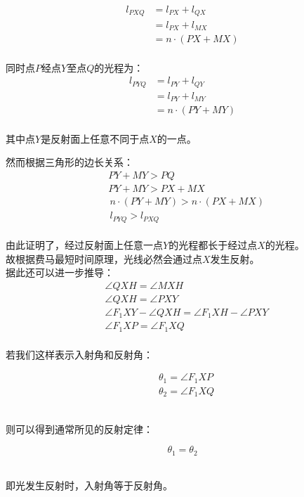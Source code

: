 \documentclass[UTF8]{ctexart}
\begin{document}
    \begin{align}
        l_{PXQ}
        &=l_{PX}+l_{QX}\\[1mm]
        &=l_{PX}+l_{MX}\\[1mm]
        &=n\cdot(PX+MX)
    \end{align}\\
    同时点$P$经点$Y$至点$Q$的光程为：
    \begin{align}
        l_{PYQ}
        &=l_{PY}+l_{QY}\\[1mm]
        &=l_{PY}+l_{MY}\\[1mm]
        &=n\cdot(PY+MY)
    \end{align}\\
    其中点$Y$是反射面上任意不同于点$X$的一点。

\newpage

    然而根据三角形的边长关系：
    \begin{align}
        &PY+MY>PQ\\[4mm]
        &PY+MY>PX+MX\\[4mm]
        &\,n\cdot(PY+MY)>n\cdot(PX+MX)\\[4mm]
        &\,l_{PYQ}>l_{PXQ}
    \end{align}\\
    由此证明了，经过反射面上任意一点$Y$的光程都长于经过点$X$的光程。\\[3mm]
    故根据费马最短时间原理，光线必然会通过点$X$发生反射。\\[8mm]
    据此还可以进一步推导：
    \begin{align}
        &\angle QXH=\angle MXH\\[4mm]
        &\angle QXH=\angle PXY\\[4mm]
        &\angle F_1XY-\angle QXH=\angle F_1XH-\angle PXY\\[4mm]
        &\angle F_1XP=\angle F_1XQ
    \end{align}\\
    若我们这样表示入射角和反射角：
    \begin{large}
        \begin{align*}
            &\theta_1=\angle F_1XP\\[4mm]
            &\theta_2=\angle F_1XQ
        \end{align*}
    \end{large}\\
    则可以得到通常所见的反射定律：
    \begin{large}
        \begin{equation*}
            \theta_1=\theta_2
        \end{equation*}
    \end{large}\\
    即光发生反射时，入射角等于反射角。
\end{document}
